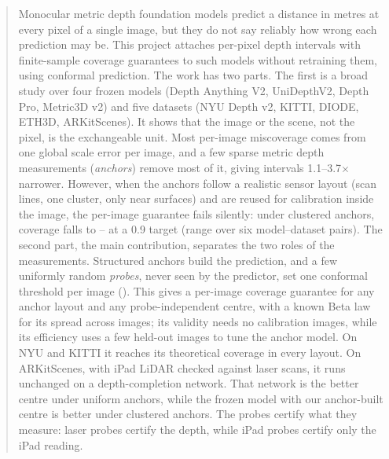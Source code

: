 \begin{abstract}
Monocular metric depth foundation models predict a distance in metres at every pixel of a single image, but they do not say reliably how wrong each prediction may be.
This project attaches per-pixel depth intervals with finite-sample coverage guarantees to such models without retraining them, using conformal prediction.
The work has two parts.
The first is a broad study over four frozen models (Depth Anything V2, UniDepthV2, Depth Pro, Metric3D v2) and five datasets (NYU Depth v2, KITTI, DIODE, ETH3D, ARKitScenes).
It shows that the image or the scene, not the pixel, is the exchangeable unit.
Most per-image miscoverage comes from one global scale error per image, and a few sparse metric depth measurements (\emph{anchors}) remove most of it, giving intervals 1.1--3.7$\times$ narrower.
However, when the anchors follow a realistic sensor layout (scan lines, one cluster, only near surfaces) and are reused for calibration inside the image, the per-image guarantee fails silently: under clustered anchors, coverage falls to \NumLocalClusterCovLo--\NumLocalClusterCovHi{} at a 0.9 target (range over six model--dataset pairs).
The second part, the main contribution, separates the two roles of the measurements.
Structured anchors build the prediction, and a few uniformly random \emph{probes}, never seen by the predictor, set one conformal threshold per image (\mDual).
This gives a per-image coverage guarantee for any anchor layout and any probe-independent centre, with a known Beta law for its spread across images; its validity needs no calibration images, while its efficiency uses a few held-out images to tune the anchor model.
On NYU and KITTI it reaches its theoretical coverage in every layout.
On ARKitScenes, with iPad LiDAR checked against laser scans, it runs unchanged on a depth-completion network.
That network is the better centre under uniform anchors, while the frozen model with our anchor-built centre is better under clustered anchors.
The probes certify what they measure: laser probes certify the depth, while iPad probes certify only the iPad reading.
\end{abstract}
